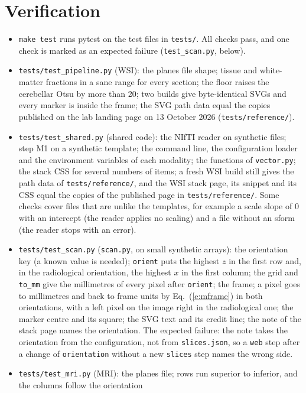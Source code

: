 \documentclass[10pt,a4paper]{article}
\newcommand{\code}[1]{\texttt{#1}}
\begin{document}
\section{Verification}
\begin{itemize}
\item \code{make test} runs pytest on the test files in \code{tests/}. All checks pass, and one check is marked as an
expected failure (\code{test\_scan.py}, below).
\item \code{tests/test\_pipeline.py} (WSI): the planes file shape; tissue and white-matter fractions in a sane range for every
section; the floor raises the cerebellar Otsu by more than 20; two builds give byte-identical SVGs and every marker is inside the
frame; the SVG path data equal the copies published on the lab landing page on 13 October 2026 (\code{tests/reference/}).
\item \code{tests/test\_shared.py} (shared code): the NIfTI reader on synthetic files; step M1 on a synthetic
template; the command line, the configuration loader and the environment variables of each modality; the functions of
\code{vector.py}; the stack CSS for several numbers of items; a fresh WSI build still gives the path data of
\code{tests/reference/}, and the WSI stack page, its snippet and its CSS equal the copies of the published page in
\code{tests/reference/}. Some checks cover files that are unlike the templates, for example a scale slope of 0 with an
intercept (the reader applies no scaling) and a file without an sform (the reader stops with an error).
\item \code{tests/test\_scan.py} (\code{scan.py}, on small synthetic arrays): the orientation key (a known value is needed);
\code{orient} puts the highest $z$ in the first row and, in the radiological orientation, the highest $x$ in the first column;
the grid and \code{to\_mm} give the millimetres of every pixel after \code{orient}; the frame; a pixel goes to millimetres and
back to frame units by Eq.~(\ref{e:mframe}) in both orientations, with a left pixel on the image right in the radiological one;
the marker centre and its square; the SVG text and its credit line; the note of the stack page names the orientation.
The expected failure: the note takes the orientation from the configuration, not from \code{slices.json}, so a \code{web}
step after a change of \code{orientation} without a new \code{slices} step names the wrong side.
\item \code{tests/test\_mri.py} (MRI): the planes file; rows run superior to inferior, and the columns follow the orientation

\end{itemize}
\end{document}
